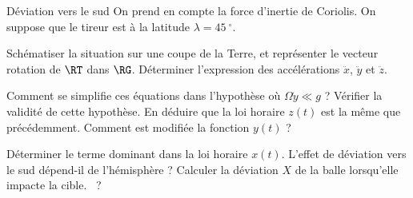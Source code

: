 \begin{exo}[PC][2][TD]{Déviation vers le sud}
On prend en compte la force d'inertie de Coriolis. On suppose que le tireur est à la latitude $\lambda = \SI{45}{^\circ}$.
\begin{quest}
\item Schématiser la situation sur une coupe de la Terre, et représenter le vecteur rotation de $\RT$ dans $\RG$. Déterminer l’expression des accélérations $\ddot{x}$, $\ddot{y}$ et $\ddot{z}$.
\item Comment se simplifie ces équations dans l'hypothèse où $\Omega \dot{y} \ll g$ ? Vérifier la validité de cette hypothèse. En déduire que la loi horaire $z(t)$ est la même que précédemment. Comment est modifiée la fonction $y(t)$ ? 
\item Déterminer le terme dominant dans la loi horaire $x(t)$. L’effet de déviation vers le sud dépend-il de l’hémisphère ? Calculer la déviation $X$ de la balle lorsqu'elle impacte la cible. \AN~?

\end{quest}
\end{exo}


